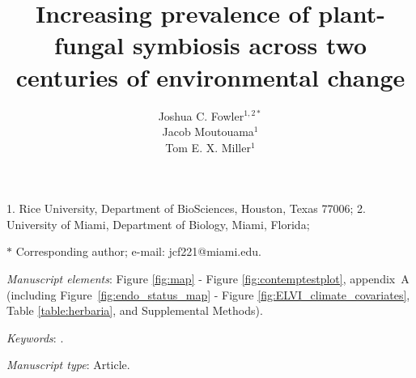 \documentclass[11pt]{article}
\title{Increasing prevalence of plant-fungal symbiosis across two centuries of environmental change}
\author{Joshua C. Fowler$^{1,2\ast}$ \\
	Jacob Moutouama$^{1}$\\
	Tom E. X. Miller$^{1}$}
\date{}
\begin{document}
	
	\maketitle
	
	\noindent{} 1. Rice University, Department of BioSciences, Houston, Texas 77006;
	\noindent{} 2. University of Miami, Department of Biology, Miami, Florida;


	\noindent{} $\ast$ Corresponding author; e-mail: jcf221@miami.edu.
	
	\bigskip
	
	\textit{Manuscript elements}: Figure \ref{fig:map} - Figure \ref{fig:contemptestplot}, appendix~A (including Figure~\ref{fig:endo_status_map} - Figure \ref{fig:ELVI_climate_covariates},  Table \ref{table:herbaria}, and Supplemental Methods).
	
	\bigskip
	
	\textit{Keywords}: .
	
	\bigskip
	
	\textit{Manuscript type}: Article. %
	
	\bigskip
	
	
	
	\newpage{}
	
\end{document}
